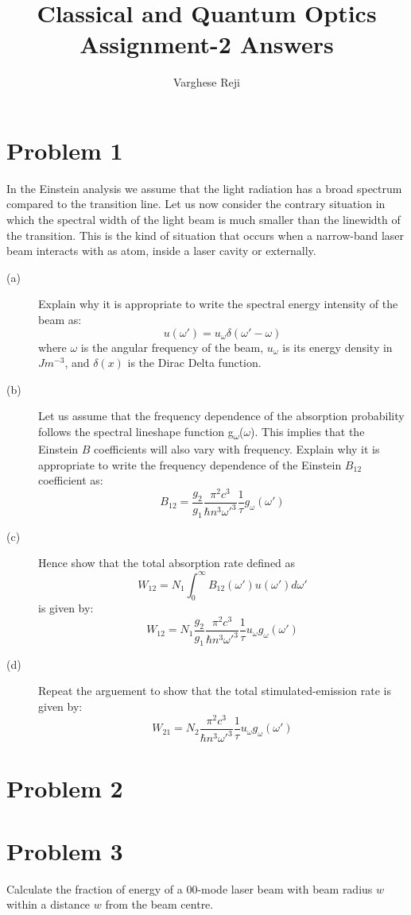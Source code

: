 \documentclass[a4paper,11pt]{article}
\author{Varghese Reji}
\date{}
\title{Classical and Quantum Optics\\\medskip
\large Assignment-2 Answers}
\begin{document}
\maketitle

\section*{Problem 1}
\label{sec:org0303043}
In the Einstein analysis we assume that the light radiation has a broad spectrum compared to the transition line. Let us now consider the contrary situation in which the spectral width of the light beam is much smaller than the linewidth of the transition. This is the kind of situation that occurs when a narrow-band laser beam interacts with as atom, inside a laser cavity or externally.
\begin{description}
\item[{(a)}] Explain why it is appropriate to write the spectral energy intensity of the beam as:
$$u(\omega') = u_\omega\delta(\omega'-\omega)$$
where \(\omega\) is the angular frequency of the beam, \(u_\omega\) is its energy density in \(Jm^{-3}\), and \(\delta(x)\) is the Dirac Delta function.
\item[{(b)}] Let us assume that the frequency dependence of the absorption probability follows the spectral lineshape function g\textsubscript{\(\omega\)}(\(\omega\)). This implies that the Einstein \(B\) coefficients will also vary with frequency. Explain why it is appropriate to write the frequency dependence of the Einstein \(B_{12}\) coefficient as:
$$B_{12} = \frac{g_2}{g_1} \frac{\pi^2c^3}{\hbar n^3\omega'^3} \frac{1}{\tau} g_{\omega}(\omega')$$
\item[{(c)}] Hence show that the total absorption rate defined as
$$W_{12} = N_1\int_{0}^{\infty} B_{12}(\omega') u(\omega')d\omega'$$
is given by:
$$W_{12} = N_1 \frac{g_2}{g_1} \frac{\pi^2c^3}{\hbar n^3\omega'^3} \frac{1}{\tau} u_{\omega}g_{\omega}(\omega')$$
\item[{(d)}] Repeat the arguement to show that the total stimulated-emission rate is given by:
$$W_{21} = N_2 \frac{\pi^2c^3}{\hbar n^3\omega'^3} \frac{1}{\tau} u_{\omega}g_{\omega}(\omega')$$
\end{description}

\section*{Problem 2}
\label{sec:orgfc0a9ca}

\newpage
\section*{Problem 3}
\label{sec:org759b8e9}
Calculate the fraction of energy of a 00-mode laser beam with beam radius \(w\) within a distance \(w\) from the beam centre.
\end{document}
